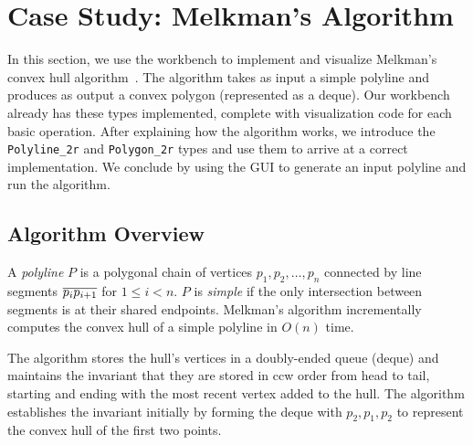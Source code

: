 
\FloatBarrier
\section{Case Study: Melkman's Algorithm}
\label{sec:case-melkman}

In this section, we use the workbench to implement and visualize Melkman's
convex hull algorithm~\cite{melkman1987line}. The algorithm takes as input a
simple polyline and produces as output a convex polygon (represented as a
deque). Our workbench already has these types implemented, complete with
visualization code for each basic operation. After explaining how the algorithm
works, we introduce the \texttt{Polyline\_2r} and \texttt{Polygon\_2r} types and
use them to arrive at a correct implementation. We conclude by using the GUI to
generate an input polyline and run the algorithm.





\subsection{Algorithm Overview}

A \emph{polyline} $P$ is a polygonal chain of vertices $p_1, p_2, \ldots, p_n$
connected by line segments $\seg{p_ip_{i+1}}$ for $1 \leq i < n$. $P$ is
\emph{simple} if the only intersection between segments is at their shared endpoints.
Melkman's algorithm incrementally computes the convex hull of a simple polyline
in $O(n)$ time. 

The algorithm stores the hull's vertices in a doubly-ended queue (deque) and
maintains the invariant that they are stored in ccw order from head to tail,
starting and ending with the most recent vertex added to the hull. The algorithm
establishes the invariant initially by forming the deque with $p_2, p_1, p_2$ to
represent the convex hull of the first two points. 

